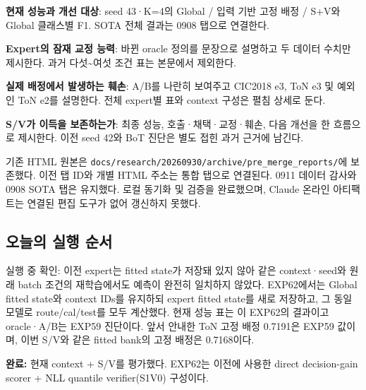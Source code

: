 \par\noindent \textbullet\enspace \textbf{현재 성능과 개선 대상}: seed 43·K=\allowbreak{}4의 Global /\allowbreak{} 입력 기반 고정 배정 /\allowbreak{} S+\allowbreak{}V와 Global 클래스별 F1. SOTA 전체 결과는 0908 탭으로 연결한다.


\par\noindent \textbullet\enspace \textbf{Expert의 잠재 교정 능력}: 바뀐 oracle 정의를 문장으로 설명하고 두 데이터 수치만 제시한다. 과거 다섯\textasciitilde{}여섯 조건 표는 본문에서 제외한다.


\par\noindent \textbullet\enspace \textbf{실제 배정에서 발생하는 훼손}: A/\allowbreak{}B를 나란히 보여주고 CIC2018 e3, ToN e3 및 예외인 ToN e2를 설명한다. 전체 expert별 표와 context 구성은 펼침 상세로 둔다.


\par\noindent \textbullet\enspace \textbf{S/\allowbreak{}V가 이득을 보존하는가}: 최종 성능, 호출·채택·교정·훼손, 다음 개선을 한 흐름으로 제시한다. 이전 seed 42와 BoT 진단은 별도 접힌 과거 근거에 남긴다.


기존 HTML 원본은 \texttt{docs/\allowbreak{}\allowbreak{}res\allowbreak{}earch/\allowbreak{}\allowbreak{}20\allowbreak{}260930/\allowbreak{}\allowbreak{}a\allowbreak{}rchive/\allowbreak{}\allowbreak{}p\allowbreak{}re\_\allowbreak{}\allowbreak{}merge\allowbreak{}\_\allowbreak{}\allowbreak{}reports\allowbreak{}/\allowbreak{}\allowbreak{}}에 보존했다. 이전 탭 ID와 개별 HTML 주소는 통합 탭으로 연결된다. 0911 데이터 감사와 0908 SOTA 탭은 유지했다. 로컬 동기화 및 검증을 완료했으며, Claude 온라인 아티팩트는 연결된 편집 도구가 없어 갱신하지 못했다.

\subsection{오늘의 실행 순서}
실행 중 확인: 이전 expert는 fitted state가 저장돼 있지 않아 같은 context·seed와 원래 batch 조건의 재학습에서도 예측이 완전히 일치하지 않았다. EXP62에서는 Global fitted state와 context IDs를 유지하되 expert fitted state를 새로 저장하고, 그 동일 모델로 route/\allowbreak{}cal/\allowbreak{}test를 모두 계산했다. 현재 성능 표는 이 EXP62의 결과이고 oracle·A/\allowbreak{}B는 EXP59 진단이다. 앞서 안내한 ToN 고정 배정 0.7191은 EXP59 값이며, 이번 S/\allowbreak{}V와 같은 fitted bank의 고정 배정은 0.7168이다.

\par\noindent \textbullet\enspace \textbf{완료:} 현재 context +\allowbreak{} S/\allowbreak{}V를 평가했다. EXP62는 이전에 사용한 direct decision-gain scorer +\allowbreak{} NLL quantile verifier(S1V0) 구성이다.


